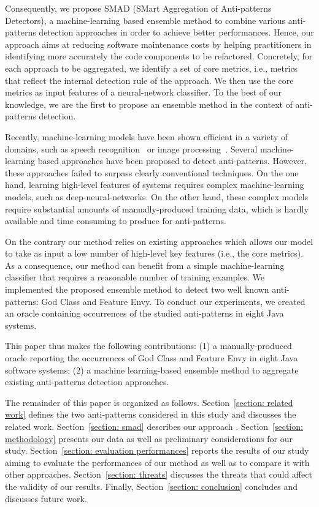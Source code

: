 Consequently, we propose SMAD (SMart Aggregation of Anti-patterns Detectors), a machine-learning based ensemble method to combine various anti-patterns detection approaches in order to achieve better performances. Hence, our approach aims at reducing software maintenance costs by helping practitioners in identifying more accurately the code components to be refactored. Concretely, for each approach to be aggregated, we identify a set of core metrics, i.e., metrics that reflect the internal detection rule of the approach. We then use the core metrics as input features of a neural-network classifier. To the best of our knowledge, we are the first to propose an ensemble method in the context of anti-patterns detection.

Recently, machine-learning models have been shown efficient in a variety of domains, such as speech recognition~\cite{graves2013speech} or image processing~\cite{krizhevsky2012imagenet}. Several machine-learning based approaches have been proposed to detect anti-patterns. However, these approaches failed to surpass clearly conventional techniques. On the one hand, learning high-level features of systems requires complex machine-learning models, such as deep-neural-networks. On the other hand, these complex models require substantial amounts of manually-produced training data, which is hardly available and time consuming to produce for anti-patterns.

On the contrary our method relies on existing approaches which allows our model to take as input a low number of high-level key features (i.e.,  the core metrics). As a consequence, our method can benefit from a simple machine-learning classifier that requires a reasonable number of training examples. We implemented the proposed ensemble method to detect two well known anti-patterns: God Class and Feature Envy. To conduct our experiments, we created an oracle containing occurrences of the studied anti-patterns in eight Java systems. 

This paper thus makes the following contributions: (1) a manually-produced oracle reporting the occurrences of God Class and Feature Envy in eight Java software systems; (2) a machine learning-based ensemble method to aggregate existing anti-patterns detection approaches.

The remainder of this paper is organized as follows. Section~\ref{section: related work} defines the two anti-patterns considered in this study and discusses the related work. Section~\ref{section: smad} describes our approach \NAME{}. Section~\ref{section: methodology} presents our data as well as preliminary considerations for our study. Section~\ref{section: evaluation performances} reports the results of our study aiming to evaluate the performances of our method as well as to compare it with other approaches. Section~\ref{section: threats} discusses the threats that could affect the validity of our results. Finally, Section~\ref{section: conclusion} concludes and discusses future work.
